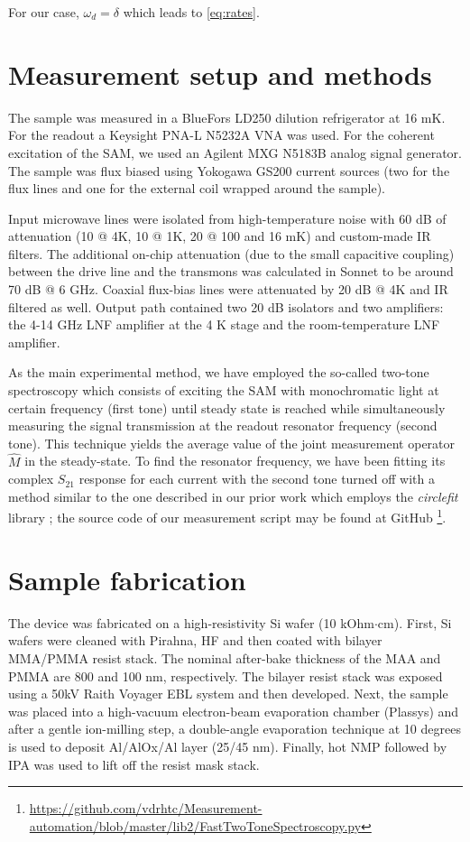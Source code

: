 \documentclass[%
 aps, prx,
 amsmath,amssymb,
 reprint,%
superscriptaddress
]{revtex4-2}
\begin{document}
For our case, $ \omega_d = \delta$ which leads to \eqref{eq:rates}.

\section{Measurement setup and 
methods}\label{sec:meas_setup}
The sample was measured in a BlueFors LD250 dilution refrigerator at 16 mK. For the readout a Keysight PNA-L N5232A VNA was used. For the coherent excitation of the SAM, we used an Agilent MXG N5183B analog signal generator. The sample was 
flux biased using Yokogawa GS200 current sources (two for the flux lines and one for the external coil wrapped around the sample).

Input microwave lines were isolated from 
high-temperature noise with 60 dB of attenuation 
(10 @ 4K, 10 @ 1K, 20 @ 100 and 16 mK) and 
custom-made IR filters. The additional on-chip 
attenuation (due to the small capacitive 
coupling) between the drive line and the 
transmons was calculated in Sonnet to be around 
70 dB @ 6 GHz. Coaxial flux-bias lines were 
attenuated by 20 dB @ 4K and IR filtered as well. 
Output path contained two 20 dB isolators and two 
amplifiers: the 4-14 GHz LNF amplifier at the 4 K 
stage and the room-temperature LNF amplifier.

As the main experimental method, we have employed the so-called two-tone spectroscopy which consists of exciting the SAM with monochromatic light at certain frequency (first tone) until steady state is reached while simultaneously measuring the signal transmission at the readout resonator frequency (second tone). This technique yields the average value of the joint measurement operator $\hat M$ in the steady-state. To find the resonator frequency, we have been fitting its complex $S_{21}$ response for each current with the second tone turned off with a method similar to the one described in our prior work \cite{fedorov2019automated} which employs the \textit{circlefit} library \cite{probst2015efficient}; the source code of our measurement script may be found at GitHub \footnote{\url{https://github.com/vdrhtc/Measurement-automation/blob/master/lib2/FastTwoToneSpectroscopy.py}}.


\section{Sample fabrication}\label{sec:fab}
The device was fabricated on a high-resistivity
Si wafer (10 kOhm$\cdot$cm). First, Si wafers 
were cleaned with Pirahna, HF and then coated 
with bilayer MMA/PMMA resist stack. The nominal 
after-bake thickness of the MAA and PMMA are 800 
and 100 nm, respectively. The
bilayer resist stack was exposed using a 50kV 
Raith Voyager EBL system and then developed. 
Next, the sample was placed into a high-vacuum 
electron-beam evaporation
chamber (Plassys) and after a gentle ion-milling 
step, a double-angle evaporation technique at 10 degrees 
is used to deposit Al/AlOx/Al layer (25/45 nm). Finally, hot 
NMP followed by IPA was used to lift off the 
resist mask stack.


\end{document}
